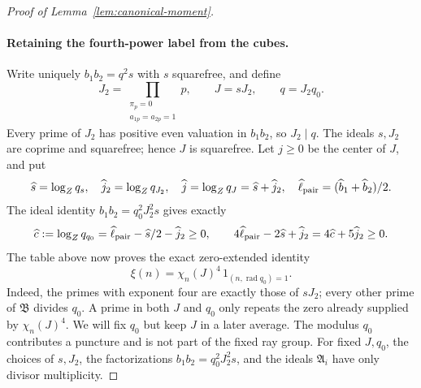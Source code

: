 \documentclass[12pt]{article}
\begin{document}
\begin{proof}[Proof of Lemma~\ref{lem:canonical-moment}]
\paragraph{Retaining the fourth-power label from the cubes.}
Write uniquely \(b_1b_2=q^2s\) with \(s\) squarefree, and define
\[
 J_2=\prod_{\substack{\pi_p=0\\a_{1p}=a_{2p}=1}}p,\qquad
 J=sJ_2,\qquad q=J_2q_0.
\]
Every prime of \(J_2\) has positive even valuation in \(b_1b_2\),
so \(J_2\mid q\).  The ideals \(s,J_2\) are coprime and squarefree;
hence \(J\) is squarefree.  Let \(j\ge0\) be the center of \(J\), and put
\[
 \widehat s=\log_Zq_s,\quad \widehat j_2=\log_Zq_{J_2},\quad
 \widehat j=\log_Zq_J=\widehat s+\widehat j_2,\quad
 \widehat\ell_{\rm pair}=(\widehat b_1+\widehat b_2)/2.
\]
The ideal identity \(b_1b_2=q_0^2J_2^2s\) gives exactly
\begin{equation}\label{eq:inverse-cube-actual}
 \widehat c:=\log_Zq_{q_0}
   =\widehat\ell_{\rm pair}-\widehat s/2-\widehat j_2\ge0,
 \qquad
 4\widehat\ell_{\rm pair}-2\widehat s+\widehat j_2
   =4\widehat c+5\widehat j_2\ge0.
\end{equation}
The table above now proves the exact zero-extended identity
\begin{equation}\label{eq:retained-cube-label}
 \xi(n)=\chi_n(J)^4\,1_{(n,\operatorname{rad}q_0)=1}.
\end{equation}
Indeed, the primes with exponent four are exactly those of \(sJ_2\);
every other prime of \(\mathfrak B\) divides \(q_0\).  A prime in
both \(J\) and \(q_0\) only repeats the zero already supplied by
\(\chi_n(J)^4\).  We will fix \(q_0\) but keep \(J\) in a later
average.  The modulus \(q_0\) contributes a puncture and is not part
of the fixed ray group.
For fixed \(J,q_0\), the choices of \(s,J_2\), the factorizations
\(b_1b_2=q_0^2J_2^2s\), and the ideals \(\mathfrak A_i\) have only
divisor multiplicity.


\end{proof}
\end{document}
